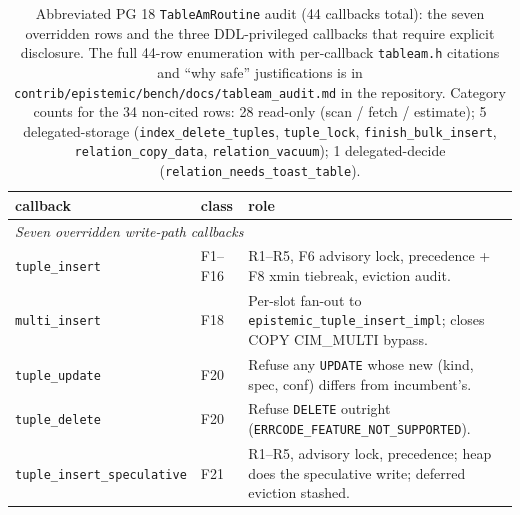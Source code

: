 %

\begin{table}[t]
\centering
\caption{Abbreviated PG 18 \texttt{TableAmRoutine} audit (44 callbacks
  total): the seven overridden rows and the three DDL-privileged
  callbacks that require explicit disclosure. The full 44-row
  enumeration with per-callback \texttt{tableam.h} citations and ``why
  safe'' justifications is in
  \texttt{contrib/epistemic/bench/docs/tableam\_audit.md}
  in the repository. Category counts for the 34 non-cited rows:
  28 read-only (scan / fetch / estimate);
  5 delegated-storage (\texttt{index\_delete\_tuples}, \texttt{tuple\_lock},
    \texttt{finish\_bulk\_insert}, \texttt{relation\_copy\_data},
    \texttt{relation\_vacuum});
  1 delegated-decide (\texttt{relation\_needs\_toast\_table}).}
\label{tab:tableam-audit}
\scriptsize
\setlength{\tabcolsep}{3pt}
\begin{tabular}{p{2.6cm}p{1.1cm}p{3.5cm}}
\toprule
callback & class & role \\
\midrule
\multicolumn{3}{l}{\emph{Seven overridden write-path callbacks}} \\
\midrule
\texttt{tuple\_insert}               & F1--F16 & R1--R5, F6 advisory lock, precedence + F8 xmin tiebreak, eviction audit. \\
\texttt{multi\_insert}               & F18 & Per-slot fan-out to \texttt{epistemic\_tuple\_insert\_impl}; closes COPY CIM\_MULTI bypass. \\
\texttt{tuple\_update}               & F20 & Refuse any \texttt{UPDATE} whose new (kind, spec, conf) differs from incumbent's. \\
\texttt{tuple\_delete}               & F20 & Refuse \texttt{DELETE} outright (\texttt{ERRCODE\_FEATURE\_NOT\_SUPPORTED}). \\
\texttt{tuple\_insert\_speculative}  & F21 & R1--R5, advisory lock, precedence; heap does the speculative write; deferred eviction stashed. \\

\end{tabular}
\end{table}
